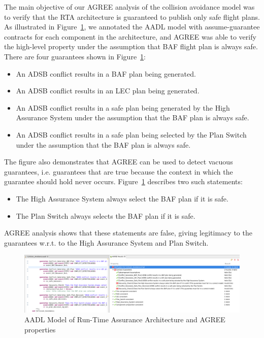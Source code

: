 The main objective of our AGREE analysis of the collision avoidance model was to verify that the RTA architecture is guaranteed to publish only safe flight plans.
%
As illustrated in Figure~\ref{fig:rta-agree}, we annotated the AADL model with assume-guarantee contracts for each component in the architecture, and AGREE was able to verify the high-level property under the assumption that BAF flight plan is always safe.
There are four guarantees shown in Figure~\ref{fig:rta-agree}:
\begin{itemize}
\item An ADSB conflict results in a BAF plan being generated.
\item An ADSB conflict results in an LEC plan being generated.
\item An ADSB conflict results in a safe plan being generated by the High Assurance System under the assumption that the BAF plan is always safe.
\item An ADSB conflict results in a safe plan being selected by the Plan Switch under the assumption that the BAF plan is always safe.
\end{itemize}
The figure also demonstrates that AGREE can be used to detect vacuous guarantees, i.e. guarantees that are true because the context in which the guarantee should hold never occurs. Figure~\ref{fig:rta-agree} describes two such statements:
\begin{itemize}
\item The High Assurance System always select the BAF plan if it is safe.
\item The Plan Switch always selects the BAF plan if it is safe.
\end{itemize}
AGREE analysis shows that these statements are false, giving legitimacy to the guarantees w.r.t. to the High Assurance System and Plan Switch.

\begin{figure}
	\centering
	\includegraphics[width=\textwidth]{figures/rta-agree-v2.jpg}
	\caption{AADL Model of Run-Time Assurance Architecture and AGREE properties}
	\label{fig:rta-agree}
\end{figure}
